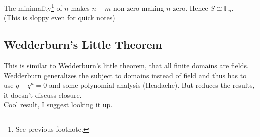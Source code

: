 The minimality\footnote{See previous footnote.} of $n$ makes $n-m$ non-zero making $n$ zero.
Hence $S\cong\mathbb{F}_{n}$.
\\

(This is sloppy even for quick notes)

\subsection{Wedderburn's Little Theorem}
This is similar to Wedderburn's little theorem, 
that all finite domains are fields.
Wedderburn generalizes the subject to domains instead of field and thus has to use $q-q^n = 0$ and some polynomial analysis (Headache).
But reduces the results,
it doesn't discuss closure.
\\

Cool result,
I suggest looking it up.
